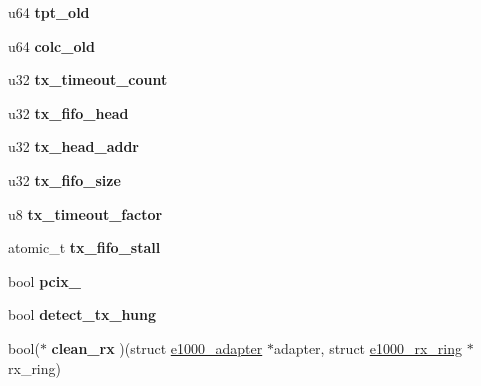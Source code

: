 \begin{DoxyCompactItemize}
\item 
\hypertarget{structe1000__adapter_ab1c86796d299f6a3fb8bd80b89848faa}{
u64 {\bfseries tpt\_\-old}}
\label{structe1000__adapter_ab1c86796d299f6a3fb8bd80b89848faa}

\item 
\hypertarget{structe1000__adapter_ad3b967396f1a29e50d18d27dce3e144f}{
u64 {\bfseries colc\_\-old}}
\label{structe1000__adapter_ad3b967396f1a29e50d18d27dce3e144f}

\item 
\hypertarget{structe1000__adapter_a5e97a6e866b2620f344c20f7767114f2}{
u32 {\bfseries tx\_\-timeout\_\-count}}
\label{structe1000__adapter_a5e97a6e866b2620f344c20f7767114f2}

\item 
\hypertarget{structe1000__adapter_aa7c80c6e72235320c4e2381468c46e16}{
u32 {\bfseries tx\_\-fifo\_\-head}}
\label{structe1000__adapter_aa7c80c6e72235320c4e2381468c46e16}

\item 
\hypertarget{structe1000__adapter_af297eafa4afab90ccca910b3563fc50f}{
u32 {\bfseries tx\_\-head\_\-addr}}
\label{structe1000__adapter_af297eafa4afab90ccca910b3563fc50f}

\item 
\hypertarget{structe1000__adapter_ab9ce6eef34cd4cfb36ab717720186f8e}{
u32 {\bfseries tx\_\-fifo\_\-size}}
\label{structe1000__adapter_ab9ce6eef34cd4cfb36ab717720186f8e}

\item 
\hypertarget{structe1000__adapter_a2bfeb5f7e71ce095da98b2a035c3e94d}{
u8 {\bfseries tx\_\-timeout\_\-factor}}
\label{structe1000__adapter_a2bfeb5f7e71ce095da98b2a035c3e94d}

\item 
\hypertarget{structe1000__adapter_a77685a6dd067c1f7560b04fd131bdb05}{
atomic\_\-t {\bfseries tx\_\-fifo\_\-stall}}
\label{structe1000__adapter_a77685a6dd067c1f7560b04fd131bdb05}

\item 
\hypertarget{structe1000__adapter_afb0185f55d3bbdc162f94de6fe387026}{
bool {\bfseries pcix\_}}
\label{structe1000__adapter_afb0185f55d3bbdc162f94de6fe387026}

\item 
\hypertarget{structe1000__adapter_a6a195b85447dd6b818fc35879f4a1c5d}{
bool {\bfseries detect\_\-tx\_\-hung}}
\label{structe1000__adapter_a6a195b85447dd6b818fc35879f4a1c5d}

\item 
\hypertarget{structe1000__adapter_aacf6d61332bc5a5a778a97e9e597ab0b}{
bool($\ast$ {\bfseries clean\_\-rx} )(struct \hyperlink{structe1000__adapter}{e1000\_\-adapter} $\ast$adapter, struct \hyperlink{structe1000__rx__ring}{e1000\_\-rx\_\-ring} $\ast$rx\_\-ring)}
\label{structe1000__adapter_aacf6d61332bc5a5a778a97e9e597ab0b}


\end{DoxyCompactItemize}
